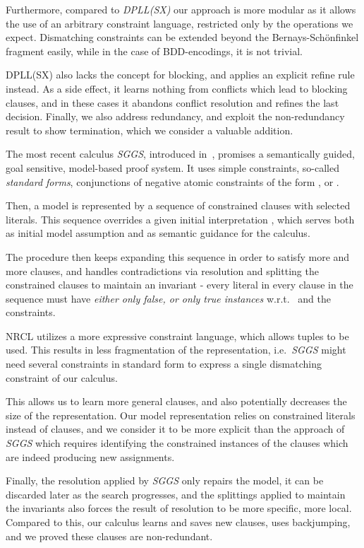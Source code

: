 \documentclass[a4paper]{article}
\newcommand{\mEPR}{Bernays-Sch\"onfinkel}
\newcommand{\ie}{i.e.\ }
\newcommand{\wrt}{w.r.t.\ }
\begin{document}
{Furthermore, compared to \emph{DPLL(SX)} our approach is more modular 
as it allows the use of an arbitrary constraint language, restricted only by the operations we expect. 
Dismatching constraints can be extended beyond the {\mEPR} fragment easily, while in 
the case of BDD-encodings, it is not trivial.

DPLL(SX) also lacks the concept for blocking, and applies an explicit refine rule instead.
As a side effect, it learns nothing from conflicts which lead to blocking clauses, and 
in these cases it abandons conflict resolution and refines the last decision.
Finally, we also address redundancy, and exploit the non-redundancy result to show termination, which we consider a valuable addition.

The most recent calculus \emph{SGGS}, introduced in~\cite{SGGSExposition}, promises a semantically guided, goal sensitive, model-based proof system. 
It uses simple constraints, so-called \emph{standard forms}, conjunctions of negative atomic constraints 
of the form , or .

Then, a model is represented by a sequence of constrained clauses with selected literals. 
This sequence overrides a given initial interpretation , 
which serves both as initial model assumption and as semantic guidance for the calculus.

The procedure then keeps expanding this sequence in order to satisfy more and more clauses, and handles contradictions via resolution and splitting 
the constrained clauses to maintain an invariant - 
every literal in every clause in the sequence must have \emph{either only false, or only true instances} \wrt 
 and the constraints.

NRCL utilizes a more expressive constraint language, which allows tuples to be used.
This results in less fragmentation of the representation, \ie \emph{SGGS} might need several constraints in standard form
to express a single dismatching constraint of our calculus. 

This allows us to learn more general clauses, and also potentially decreases the size of the representation. 
Our model representation relies on constrained literals instead of clauses, and we consider it to be more
explicit than the approach of \emph{SGGS} which requires identifying the constrained instances of the clauses which are indeed
producing new assignments.

Finally, the resolution applied by \emph{SGGS} only repairs the model, it can be discarded later as the search progresses, and the splittings applied to maintain the invariants 
also forces the result of resolution to be more specific, more local. 
Compared to this, our calculus learns and saves new clauses, uses backjumping, and we proved these clauses are non-redundant.

}
\end{document}
